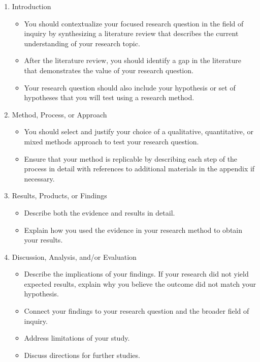 \documentclass[11pt,]{article}
\providecommand{\tightlist}{%
  \setlength{\itemsep}{0pt}\setlength{\parskip}{0pt}}
\begin{document}
\begin{enumerate}
\def\labelenumi{\arabic{enumi}.}
\item
  Introduction

  \begin{itemize}
  \tightlist
  \item
    You should contextualize your focused research question in the field of inquiry by synthesizing a literature review that describes the current understanding of your research topic.
  \item
    After the literature review, you should identify a gap in the literature that demonstrates the value of your research question.
  \item
    Your research question should also include your hypothesis or set of hypotheses that you will test using a research method.
  \end{itemize}
\item
  Method, Process, or Approach

  \begin{itemize}
  \tightlist
  \item
    You should select and justify your choice of a qualitative, quantitative, or mixed methods approach to test your research question.
  \item
    Ensure that your method is replicable by describing each step of the process in detail with references to additional materials in the appendix if necessary.
  \end{itemize}
\item
  Results, Products, or Findings

  \begin{itemize}
  \tightlist
  \item
    Describe both the evidence and results in detail.
  \item
    Explain how you used the evidence in your research method to obtain your results.
  \end{itemize}
\item
  Discussion, Analysis, and/or Evaluation

  \begin{itemize}
  \tightlist
  \item
    Describe the implications of your findings. If your research did not yield expected results, explain why you believe the outcome did not match your hypothesis.
  \item
    Connect your findings to your research question and the broader field of inquiry.
  \item
    Address limitations of your study.
  \item
    Discuss directions for further studies.
  \end{itemize}
\end{enumerate}
\end{document}
